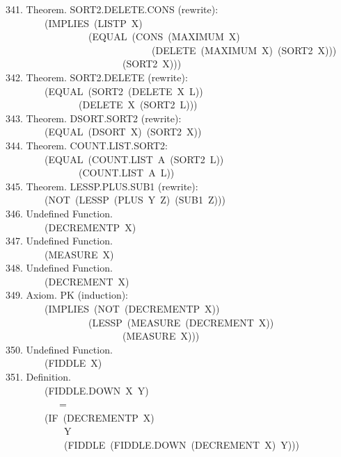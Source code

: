 \documentclass[10pt]{book}
\newenvironment{pubasis}{\begin{flushleft}}{\end{flushleft}}
\begin{document}
\begin{pubasis}
341.    Theorem.  SORT2.DELETE.CONS (rewrite):\\
~~~~~~~~(IMPLIES~(LISTP~X)\\
~~~~~~~~~~~~~~~~~(EQUAL~(CONS~(MAXIMUM~X)\\
~~~~~~~~~~~~~~~~~~~~~~~~~~~~~~(DELETE~(MAXIMUM~X)~(SORT2~X)))\\
~~~~~~~~~~~~~~~~~~~~~~~~(SORT2~X)))\\

342.    Theorem.  SORT2.DELETE (rewrite):\\
~~~~~~~~(EQUAL~(SORT2~(DELETE~X~L))\\
~~~~~~~~~~~~~~~(DELETE~X~(SORT2~L)))\\

343.    Theorem.  DSORT.SORT2 (rewrite):\\
~~~~~~~~(EQUAL~(DSORT~X)~(SORT2~X))\\

344.    Theorem.  COUNT.LIST.SORT2:\\
~~~~~~~~(EQUAL~(COUNT.LIST~A~(SORT2~L))\\
~~~~~~~~~~~~~~~(COUNT.LIST~A~L))\\

345.    Theorem.  LESSP.PLUS.SUB1 (rewrite):\\
~~~~~~~~(NOT~(LESSP~(PLUS~Y~Z)~(SUB1~Z)))\\

346.    Undefined Function.\\
~~~~~~~~(DECREMENTP~X)\\

347.    Undefined Function.\\
~~~~~~~~(MEASURE~X)\\

348.    Undefined Function.\\
~~~~~~~~(DECREMENT~X)\\

349.    Axiom.  PK (induction):\\
~~~~~~~~(IMPLIES~(NOT~(DECREMENTP~X))\\
~~~~~~~~~~~~~~~~~(LESSP~(MEASURE~(DECREMENT~X))\\
~~~~~~~~~~~~~~~~~~~~~~~~(MEASURE~X)))\\

350.    Undefined Function.\\
~~~~~~~~(FIDDLE~X)\\

351.    Definition.\\
~~~~~~~~(FIDDLE.DOWN~X~Y)\\
~~~~~~~~~~~=\\
~~~~~~~~(IF~(DECREMENTP~X)\\
~~~~~~~~~~~~Y\\
~~~~~~~~~~~~(FIDDLE~(FIDDLE.DOWN~(DECREMENT~X)~Y)))\\


\end{pubasis}
\end{document}
